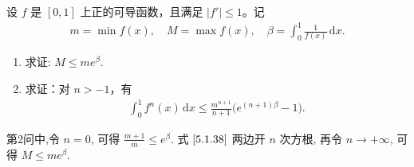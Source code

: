 \documentclass[../../main.tex]{subfiles}
\begin{document}
\begin{example}
设 \( f \) 是 \([0,1]\) 上正的可导函数，且满足 \(|f'| \leqslant 1\)。记  
\begin{align}
m = \min f(x), \quad M = \max f(x), \quad \beta = \int_{0}^{1} \frac{1}{f(x)} \, \mathrm{d}x. \label{5.1.37}
\end{align}
\begin{enumerate}
\item 求证: \( M \leqslant m e^{\beta} \).

\item 求证：对 \( n > -1 \)，有  
\begin{align}
\int_{0}^{1} f^n(x) \, \mathrm{d}x \leqslant \frac{m^{n + 1}}{n + 1} \big( e^{(n + 1)\beta} - 1 \big). \label{5.1.38}
\end{align}  
\end{enumerate}  
\end{example}
\begin{remark}
第2问中,令 \( n = 0 \), 可得 \( \frac{m + 1}{m} \leqslant e^{\beta} \). 式 \(\eqref{5.1.38}\) 两边开 \( n \) 次方根, 再令 \( n \to +\infty \), 可得 \( M \leqslant m e^{\beta} \).
\end{remark}
\end{document}
